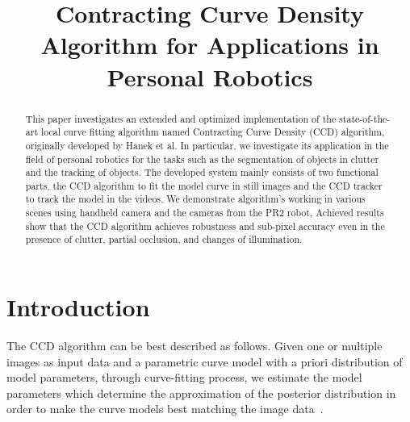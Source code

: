 \documentclass[conference]{IEEEtran}
\begin{document}
%
\title{Contracting Curve Density Algorithm for Applications in Personal Robotics}


\author{
}

\maketitle

\begin{abstract}
This paper investigates an extended and optimized
implementation of the state-of-the-art local curve fitting algorithm
named Contracting Curve Density (CCD) algorithm, originally developed 
by Hanek et al. In particular, we investigate its application  
in the field of personal robotics for the tasks such as the segmentation
of objects in clutter and the tracking of objects. 
The developed system mainly consists of two functional parts, the CCD
algorithm to fit the model curve in still images and the CCD tracker to
track the model in the videos. We demonstrate algorithm's working 
in various scenes using handheld camera and the cameras from the 
PR2 robot. Achieved results show that the CCD algorithm achieves 
robustness and sub-pixel accuracy even in the presence of clutter, 
partial occlusion, and changes of illumination.
\end{abstract}

\IEEEpeerreviewmaketitle

\section{Introduction}
The CCD algorithm can be best described as follows. Given one or multiple images as input
data and a parametric curve model with a priori distribution of model
parameters, through curve-fitting process, we estimate the model
parameters which determine the approximation of the posterior
distribution in order to make the curve models best matching the image 
data~\cite{hanek2004contracting}.
\end{document}
